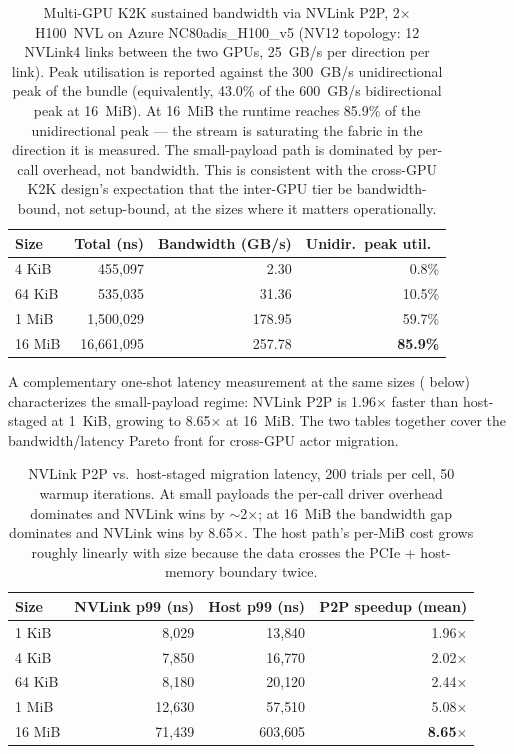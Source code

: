 \begin{table}[htbp]
\centering
\begin{tabular}{lrrr}
\toprule
Size & Total (ns) & Bandwidth (GB/s) & Unidir.\ peak util.\ \\
\midrule
4 KiB   &        455{,}097 &   2.30 &  0.8\% \\
64 KiB  &        535{,}035 &  31.36 & 10.5\% \\
1 MiB   &      1{,}500{,}029 & 178.95 & 59.7\% \\
16 MiB  &     16{,}661{,}095 & 257.78 & \textbf{85.9\%} \\
\bottomrule
\end{tabular}
\caption{Multi-GPU K2K sustained bandwidth via NVLink P2P,
2$\times$ H100~NVL on Azure NC80adis\_H100\_v5 (NV12 topology:
12 NVLink4 links between the two GPUs, 25~GB/s per direction per
link).  Peak utilisation is reported against the 300~GB/s
unidirectional peak of the bundle (equivalently, 43.0\% of the
600~GB/s bidirectional peak at 16~MiB).  At 16~MiB the runtime
reaches 85.9\% of the unidirectional peak --- the stream is
saturating the fabric in the direction it is measured.  The
small-payload path is dominated by per-call overhead, not
bandwidth.  This is consistent with the cross-GPU K2K design's
expectation that the inter-GPU tier be bandwidth-bound, not
setup-bound, at the sizes where it matters operationally.}
\label{tab:mgpu-bw}
\end{table}

A complementary one-shot latency measurement at the same sizes
( below) characterizes the small-payload
regime: NVLink P2P is 1.96$\times$ faster than host-staged at
1~KiB, growing to 8.65$\times$ at 16~MiB.  The two tables
together cover the bandwidth/latency Pareto front for
cross-GPU actor migration.

\begin{table}[htbp]
\centering
\begin{tabular}{lrrr}
\toprule
Size   & NVLink p99 (ns) & Host p99 (ns) & P2P speedup (mean) \\
\midrule
1 KiB   &      8{,}029 &     13{,}840 & 1.96$\times$ \\
4 KiB   &      7{,}850 &     16{,}770 & 2.02$\times$ \\
64 KiB  &      8{,}180 &     20{,}120 & 2.44$\times$ \\
1 MiB   &     12{,}630 &     57{,}510 & 5.08$\times$ \\
16 MiB  &     71{,}439 &    603{,}605 & \textbf{8.65$\times$} \\
\bottomrule
\end{tabular}
\caption{NVLink P2P vs.\ host-staged migration latency, 200 trials
per cell, 50 warmup iterations.  At small payloads the per-call
driver overhead dominates and NVLink wins by $\sim$2$\times$; at
16~MiB the bandwidth gap dominates and NVLink wins by 8.65$\times$.
The host path's per-MiB cost grows roughly linearly with size
because the data crosses the PCIe + host-memory boundary twice.}
\label{tab:migration}
\end{table}

